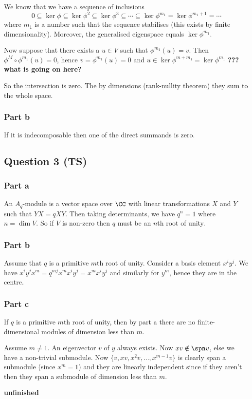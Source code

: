 We know that we have a sequence of inclusions
\[0 \subseteq \ker\phi \subseteq \ker\phi^2 \subseteq \ker\phi^3 \subseteq \cdots \subseteq \ker\phi^{m_1} = \ker\phi^{m_1+1} = \cdots\]
where $m_1$ is a number such that the sequence stabilises (this exists by finite dimensionality).
Moreover, the generalised eigenspace equals $\ker\phi^{m_1}$.

Now suppose that there exists a $u \in V$ such that $\phi^{m_1}(u)=v$.
Then $\phi^M \circ \phi^{m_1}(u) = 0$, hence $v = \phi^{m_1}(u) = 0$ and $u \in \ker \phi^{m+m_1} = \ker \phi^{m_1}$ \textbf{??? what is going on here?} 

So the intersection is zero.
The by dimensions (rank-nullity theorem) they sum to the whole space.

\subsubsection*{Part b}

If it is indecomposable then one of the direct summands is zero.

\subsection*{Question 3 (TS)}

\subsubsection*{Part a}

An $A_q$-module is a vector space over $\CC$ with linear transformations $X$ and $Y$ such that $YX=qXY$.
Then taking determinants, we have $q^n=1$ where $n = \dim V$.
So if $V$ is non-zero then $q$ must be an $n$th root of unity.

\subsubsection*{Part b}

Assume that $q$ is a primitive $m$th root of unity.
Consider a basis element $x^iy^j$.
We have $x^iy^jx^m = q^{mj}x^mx^iy^j = x^mx^iy^j$ and similarly for $y^m$, hence they are in the centre.

\subsubsection*{Part c}

If $q$ is a primitive $m$th root of unity, then by part a there are no finite-dimensional modules of dimension less than $m$.

Assume $m \neq 1$.
An eigenvector $v$ of $y$ always exists.
Now $xv \notin \spn v$, else we have a non-trivial submodule.
Now $\{v,xv,x^2v,\ldots,x^{m-1}v\}$ is clearly span a submodule (since $x^m=1$) and they are linearly independent since if they aren't then they span a submodule of dimension less than $m$.

\textbf{unfinished}